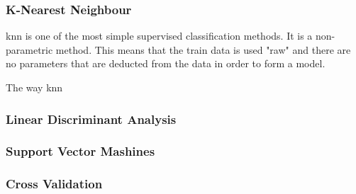 \subsubsection*{K-Nearest Neighbour}
 \gls{knn} is one of the most simple supervised classification methods. It is a non-parametric method. This means that the train data is used "raw" and there are no parameters that are deducted from the data in order to form a model. 
 
 The way \gls{knn} 
\subsubsection*{Linear Discriminant Analysis}
\subsubsection*{Support Vector Mashines}

\subsubsection*{Cross Validation}












